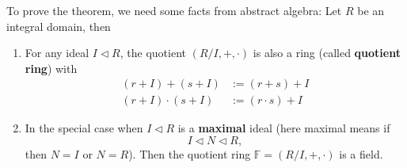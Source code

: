 \documentclass[11pt,openany]{book}
\theoremstyle{plain}
\theoremstyle{definition}
\theoremstyle{remark}
\begin{document}
To prove the theorem, we need some facts from abstract algebra: Let $R$ be an integral domain, then

\begin{enumerate}
    \item For any ideal $I \lhd R$, the quotient $(R/I, +, \cdot)$ is also a ring (called {\bf quotient ring}) with
    \begin{align*}
    (r+I) + (s+I) &:= (r+s)+I \\    
    (r+I) \cdot (s+I) &:= (r\cdot s)+I    
    \end{align*}
    \item In the special case when $I \lhd R$ is a {\bf maximal} ideal (here maximal means if 
    $$I \lhd N \lhd R,$$
    then $N = I$ or $N = R$). Then the quotient ring $\mathbb{F} = (R/I,+,\cdot)$ is a field.
\end{enumerate}
\end{document}
